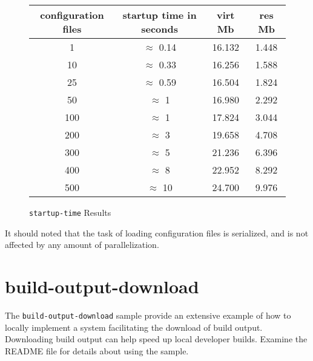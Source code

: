 \begin{figure}[tb]
  \hrulefill\vspace{10pt}
  \begin{center}
    \begin{tabular}{|c|c|c|c|}
      \hline configuration files  & startup time in seconds & virt Mb & res Mb \\
      \hline   1 & $\approx$ 0.14  & 16.132 & 1.448 \\
      \hline  10 & $\approx$ 0.33  & 16.256 & 1.588 \\
      \hline  25 & $\approx$ 0.59  & 16.504 & 1.824 \\
      \hline  50 & $\approx$ 1  & 16.980 & 2.292 \\
      \hline 100 & $\approx$ 1  & 17.824 & 3.044 \\
      \hline 200 & $\approx$ 3  & 19.658 & 4.708 \\
      \hline 300 & $\approx$ 5  & 21.236 & 6.396 \\
      \hline 400 & $\approx$ 8  & 22.952 & 8.292 \\
      \hline 500 & $\approx$ 10 & 24.700 & 9.976 \\
      \hline
    \end{tabular}
  \end{center}
\caption{\texttt{startup-time} Results}\label{samples:startup-time-results}
  \hrulefill
\end{figure}

It should noted that the task of loading configuration files is
serialized, and is not affected by any amount of parallelization.

\section{build-output-download}

The \texttt{build-output-download} sample provide an extensive example
of how to locally implement a system facilitating the download of
build output.  Downloading build output can help speed up local
developer builds.  Examine the README file for details about using the
sample.
